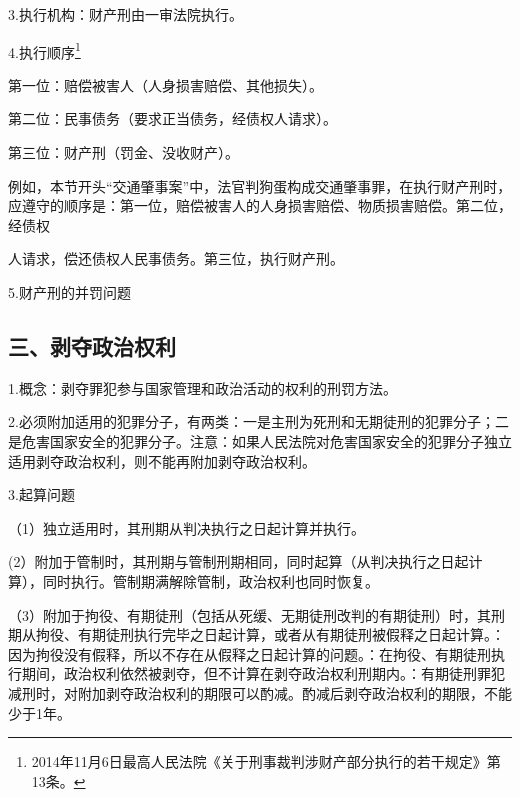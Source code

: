 3.执行机构：财产刑由一审法院执行。

4.执行顺序\footnote{2014年11月6日最高人民法院《关于刑事裁判涉财产部分执行的若干规定》第13条。}

第一位：赔偿被害人（人身损害赔偿、其他损失）。

第二位：民事债务（要求正当债务，经债权人请求）。

第三位：财产刑（罚金、没收财产）。

例如，本节开头“交通肇事案”中，法官判狗蛋构成交通肇事罪，在执行财产刑时，应遵守的顺序是：第一位，赔偿被害人的人身损害赔偿、物质损害赔偿。第二位，经债权

人请求，偿还债权人民事债务。第三位，执行财产刑。

5.财产刑的并罚问题


\subsection*{三、剥夺政治权利}

1.概念：剥夺罪犯参与国家管理和政治活动的权利的刑罚方法。

2.必须附加适用的犯罪分子，有两类：一是主刑为死刑和无期徒刑的犯罪分子；二是危害国家安全的犯罪分子。注意：如果人民法院对危害国家安全的犯罪分子独立适用剥夺政治权利，则不能再附加剥夺政治权利。

3.起算问题

（1）独立适用时，其刑期从判决执行之日起计算并执行。

(2）附加于管制时，其刑期与管制刑期相同，同时起算（从判决执行之日起计算），同时执行。管制期满解除管制，政治权利也同时恢复。

（3）附加于拘役、有期徒刑（包括从死缓、无期徒刑改判的有期徒刑）时，其刑期从拘役、有期徒刑执行完毕之日起计算，或者从有期徒刑被假释之日起计算。：因为拘役没有假释，所以不存在从假释之日起计算的问题。：在拘役、有期徒刑执行期间，政治权利依然被剥夺，但不计算在剥夺政治权利刑期内。：有期徒刑罪犯减刑时，对附加剥夺政治权利的期限可以酌减。酌减后剥夺政治权利的期限，不能少于1年。


